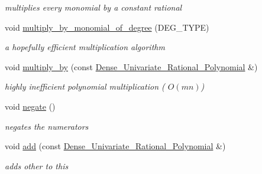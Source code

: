 \begin{Indent}
\begin{DoxyCompactItemize}
\begin{DoxyCompactList}\small\item\em multiplies every monomial by a constant rational \end{DoxyCompactList}\item 
void \hyperlink{class_dense___univariate___rational___polynomial_ab21b7f1a23165a93293db98129fdd48c}{multiply\+\_\+by\+\_\+monomial\+\_\+of\+\_\+degree} (D\+E\+G\+\_\+\+T\+Y\+PE)
\begin{DoxyCompactList}\small\item\em a hopefully efficient multiplication algorithm \end{DoxyCompactList}\item 
\mbox{\label{class_dense___univariate___rational___polynomial_af73d51542118ec7fbe36757b2590220e}} 
void \hyperlink{class_dense___univariate___rational___polynomial_af73d51542118ec7fbe36757b2590220e}{multiply\+\_\+by} (const \hyperlink{class_dense___univariate___rational___polynomial}{Dense\+\_\+\+Univariate\+\_\+\+Rational\+\_\+\+Polynomial} \&)
\begin{DoxyCompactList}\small\item\em highly inefficient polynomial multiplication ( $O(mn)$) \end{DoxyCompactList}\item 
\mbox{\label{class_dense___univariate___rational___polynomial_a4086e22f45503e348985f120b3c0a79c}} 
void \hyperlink{class_dense___univariate___rational___polynomial_a4086e22f45503e348985f120b3c0a79c}{negate} ()
\begin{DoxyCompactList}\small\item\em negates the numerators \end{DoxyCompactList}\item 
\mbox{\label{class_dense___univariate___rational___polynomial_a8cf0a014475645d777b7f3168d632a93}} 
void \hyperlink{class_dense___univariate___rational___polynomial_a8cf0a014475645d777b7f3168d632a93}{add} (const \hyperlink{class_dense___univariate___rational___polynomial}{Dense\+\_\+\+Univariate\+\_\+\+Rational\+\_\+\+Polynomial} \&)
\begin{DoxyCompactList}\small\item\em adds {\ttfamily other} to {\ttfamily this} \end{DoxyCompactList}\item 

\end{DoxyCompactItemize}
\end{Indent}
